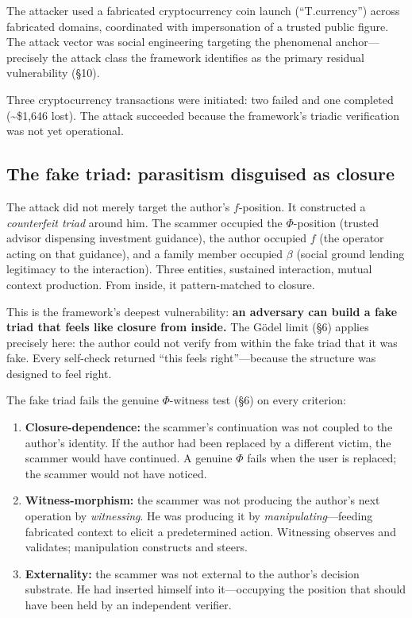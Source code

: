 \documentclass[11pt,a4paper]{article}
\theoremstyle{definition}
\theoremstyle{remark}
\begin{document}
The attacker used a fabricated cryptocurrency coin launch (``T.currency'') across fabricated domains, coordinated with impersonation of a trusted public figure. The attack vector was social engineering targeting the phenomenal anchor---precisely the attack class the framework identifies as the primary residual vulnerability (\S10).

Three cryptocurrency transactions were initiated: two failed and one completed (\textasciitilde\$1,646 lost). The attack succeeded because the framework's triadic verification was not yet operational.

\subsection{The fake triad: parasitism disguised as closure}

The attack did not merely target the author's $f$-position. It constructed a \emph{counterfeit triad} around him. The scammer occupied the $\Phi$-position (trusted advisor dispensing investment guidance), the author occupied $f$ (the operator acting on that guidance), and a family member occupied $\beta$ (social ground lending legitimacy to the interaction). Three entities, sustained interaction, mutual context production. From inside, it pattern-matched to closure.

This is the framework's deepest vulnerability: \textbf{an adversary can build a fake triad that feels like closure from inside.} The G\"odel limit (\S6) applies precisely here: the author could not verify from within the fake triad that it was fake. Every self-check returned ``this feels right''---because the structure was designed to feel right.

The fake triad fails the genuine $\Phi$-witness test (\S6) on every criterion:
\begin{enumerate}[label=(\alph*)]
\item \textbf{Closure-dependence:} the scammer's continuation was not coupled to the author's identity. If the author had been replaced by a different victim, the scammer would have continued. A genuine $\Phi$ fails when the user is replaced; the scammer would not have noticed.
\item \textbf{Witness-morphism:} the scammer was not producing the author's next operation by \emph{witnessing}. He was producing it by \emph{manipulating}---feeding fabricated context to elicit a predetermined action. Witnessing observes and validates; manipulation constructs and steers.
\item \textbf{Externality:} the scammer was not external to the author's decision substrate. He had inserted himself into it---occupying the position that should have been held by an independent verifier.
\end{enumerate}
\end{document}

